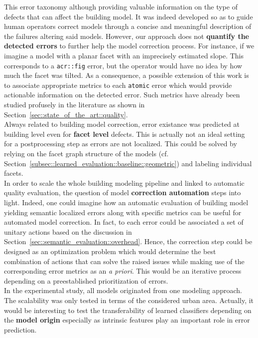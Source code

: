     This error taxonomy although providing valuable information on the type of defects that can affect the building model.
    It was indeed developed so as to guide human operators correct models through a concise and meaningful description of the failures altering said models.
    However, our approach does not \textbf{quantify the detected errors} to further help the model correction process.
    For instance, if we imagine a model with a planar facet with an imprecisely estimated slope.
    This corresponds to a \texttt{\acrfull{acr::fig}} error, but the operator would have no idea by how much the facet was tilted.
    As a consequence, a possible extension of this work is to associate appropriate metrics to each \texttt{atomic} error which would provide actionable information on the detected error.
    Such metrics have already been studied profusely in the literature as shown in Section~\ref{sec::state_of_the_art::quality}.\\

    Always related to building model correction, error existance was predicted at building level even for \textbf{facet level} defects.
    This is actually not an ideal setting for a postprocessing step as errors are not localized.
    This could be solved by relying on the facet graph structure of the models (cf. Section~\ref{subsec::learned_evaluation::baseline::geometric}) and labeling individual facets.\\

    In order to scale the whole building modeling pipeline and linked to automatic quality evaluation, the question of model \textbf{correction automation} steps into light.
    Indeed, one could imagine how an automatic evaluation of building model yielding semantic localized errors along with specific metrics can be useful for automated model correction.
    In fact, to each error could be associated a set of unitary actions based on the discussion in Section~\ref{sec::semantic_evaluation::overhead}.
    Hence, the correction step could be designed as an optimization problem which would determine the best combination of actions that can solve the raised issues while making use of the corresponding error metrics as an \textit{a priori}.
    This would be an iterative process depending on a preestablished prioritization of errors.\\
    
    In the experimental study, all models originated from one modeling approach.
    The scalability was only tested in terms of the considered urban area.
    Actually, it would be interesting to test the transferability of learned classifiers depending on the \textbf{model origin} especially as intrinsic features play an important role in error prediction.\\

